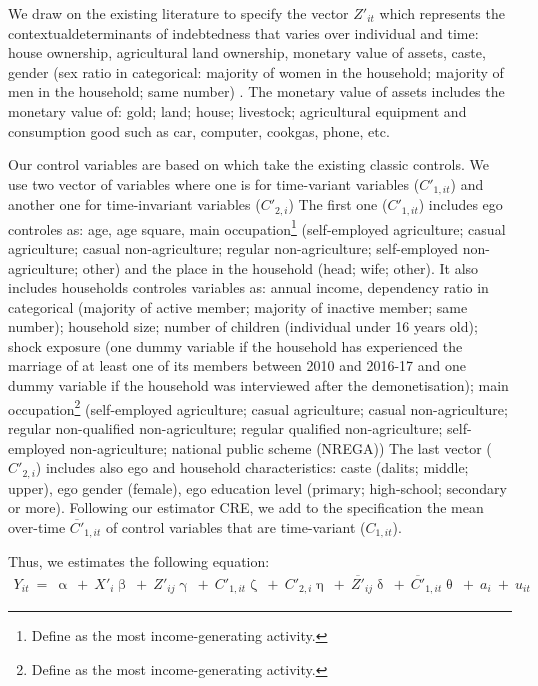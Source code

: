 \documentclass[a4paper, 11pt, onecolumn]{article}
\begin{document}
We draw on the existing literature to specify the vector $Z'_{it}$ which represents the contextualdeterminants of indebtedness that varies over individual and time: house ownership, agricultural land ownership, monetary value of assets, caste, gender (sex ratio in categorical: majority of women in the household; majority of men in the household; same number) \citep{Guerin2012a, Guerin2013a, Guerin2014, Reboul2020}.
The monetary value of assets includes the monetary value of: gold; land; house; livestock; agricultural equipment and consumption good such as car, computer, cookgas, phone, etc.

Our control variables are based on \cite{Reboul2020, Brown2014, Chichaibelu2017} which take the existing classic controls. 
We use two vector of variables where one is for time-variant variables ($C'_{1,it}$) and another one for time-invariant variables ($C'_{2,i}$) 
The first one ($C'_{1,it}$) includes ego controles as: age, age square, main occupation\footnote{Define as the most income-generating activity.} (self-employed agriculture; casual agriculture; casual non-agriculture; regular non-agriculture; self-employed non-agriculture; other) and the place in the household (head; wife; other).
It also includes households controles variables as: annual income, dependency ratio in categorical (majority of active member; majority of inactive member; same number); household size; number of children (individual under 16 years old); shock exposure (one dummy variable if the household has experienced the marriage of at least one of its members between 2010 and 2016-17 and one dummy variable if the household was interviewed after the demonetisation); main occupation\footnote{Define as the most income-generating activity.} (self-employed agriculture; casual agriculture; casual non-agriculture; regular non-qualified non-agriculture; regular qualified non-agriculture; self-employed non-agriculture; national public scheme (NREGA))
The last vector ($C'_{2,i}$) includes also ego and household characteristics: caste (dalits; middle; upper), ego gender (female), ego education level (primary; high-school; secondary or more).
Following our estimator CRE, we add to the specification the mean over-time $\overline{C'}_{1,it}$ of control variables that are time-variant ($C_{1,it}$).

Thus, we estimates the following equation:
\begin{equation}\label{eq:CREfinal}
\begin{split}
Y_{it}~=~\upalpha~+~X'_i\upbeta~+~Z'_{ij}\upgamma~+~C'_{1,it}\upzeta~+~C'_{2,i}\upeta~+~\overline{Z'}_{ij}\updelta~+~\overline{C'}_{1,it}\uptheta~+~a_i~+~u_{it}
\end{split}
\end{equation}
\end{document}
